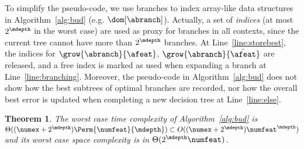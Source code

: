 \documentclass{article}
\newtheorem{theorem}{Theorem}
\begin{document}

To simplify the pseudo-code, we use branches to index array-like data structures in Algorithm~\ref{alg:bud} (e.g. $\dom[\abranch]$). Actually, a set of \emph{indices} (at most $2^{\mdepth}$ in the worst case) are used as proxy for branches in all contexts, since the current tree cannot have more than $2^{\mdepth}$ branches. At Line~\ref{line:storebest}, the indices for $\grow{\abranch}{\afeat}$, $\grow{\abranch}{\bar{\afeat}}$ are released, and a free index is marked as used when expanding a branch at Line~\ref{line:branching}. Moreover, the pseudo-code in Algorithm~\ref{alg:bud} does not show how the best subtrees of optimal branches are recorded, nor how the overall best error is updated when completing a new decision tree at Line~\ref{line:else}.











		

		\begin{theorem}
			The worst case time complexity of Algorithm~\ref{alg:bud} is $\Theta((\numex+2^\mdepth){\Perm{\numfeat}{\mdepth}}) \subset O((\numex + 2^{\mdepth})\numfeat^\mdepth)$ and its worst case space complexity is in $\Theta(2^{\mdepth}\numfeat)$.
			\end{theorem}
			
\end{document}
